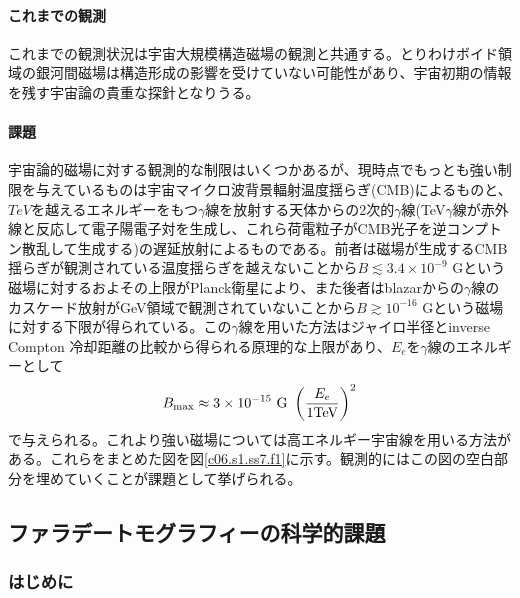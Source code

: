 \paragraph{これまでの観測}

これまでの観測状況は宇宙大規模構造磁場の観測と共通する。とりわけボイド領域の銀河間磁場は構造形成の影響を受けていない可能性があり、宇宙初期の情報を残す宇宙論の貴重な探針となりうる。

\paragraph{課題}

宇宙論的磁場に対する観測的な制限はいくつかあるが、現時点でもっとも強い制限を与えているものは宇宙マイクロ波背景輻射温度揺らぎ(CMB)によるものと、$TeV$を越えるエネルギーをもつ$\gamma$線を放射する天体からの2次的$\gamma$線(TeV$\gamma$線が赤外線と反応して電子陽電子対を生成し、これら荷電粒子がCMB光子を逆コンプトン散乱して生成する)の遅延放射によるものである。前者は磁場が生成するCMB揺らぎが観測されている温度揺らぎを越えないことから$B\lesssim 3.4\times 10^{-9}$ Gという磁場に対するおよその上限がPlanck衛星により\citep{2012PhR...517..141Y,2013arXiv1303.5076P}、また後者はblazarからの$\gamma$線のカスケード放射がGeV領域で観測されていないことから$B\gtrsim 10^{-16}$ Gという磁場に対する下限が得られている\citep{2012ApJ...744L...7T,2010Sci...328...73N,2011A&A...529A.144T}。この$\gamma$線を用いた方法はジャイロ半径とinverse Compton 冷却距離の比較から得られる原理的な上限があり、$E_e$を$\gamma$線のエネルギーとして
\begin{equation}
B_{\rm max}\approx 3\times 10^{-15}~{\rm G}~\left(\frac{E_e}{1{\rm TeV}}\right)^2
\end{equation}
で与えられる\citep{2013A&ARv..21...62D}。これより強い磁場については高エネルギー宇宙線を用いる方法がある\citep{1995ApJ...455L..21L}。これらをまとめた図を図\ref{c06.s1.ss7.f1}に示す。観測的にはこの図の空白部分を埋めていくことが課題として挙げられる。


\subsection{ファラデートモグラフィーの科学的課題}
\label{c06.s1.ss8}

\subsubsection{はじめに}
\label{c06.s1.ss8.sss1}

